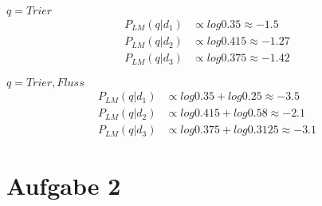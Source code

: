 \documentclass[11pt,a4paper,parskip=half ]{scrartcl}
\begin{document}
	$q = {Trier}$
	\begin{align*}
	P_{LM}(q|d_1) &\propto log 0.35 \approx -1.5\\
	P_{LM}(q|d_2) &\propto log 0.415 \approx -1.27\\
	P_{LM}(q|d_3) &\propto log 0.375 \approx -1.42
	\end{align*}
	
	$q= {Trier, Fluss}$
	\begin{align*}
	P_{LM}(q|d_1) &\propto log 0.35 + log 0.25 \approx -3.5\\
	P_{LM}(q|d_2) &\propto log 0.415 + log 0.58 \approx -2.1\\
	P_{LM}(q|d_3) &\propto log 0.375 + log 0.3125 \approx -3.1
	\end{align*}

	\section*{Aufgabe 2}
	
\end{document}
